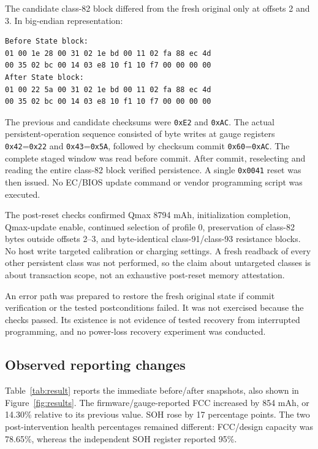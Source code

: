 \documentclass[11pt,a4paper]{article}
\newcommand{\hex}[1]{\texttt{0x#1}}
\newcommand{\code}[1]{\texttt{\detokenize{#1}}}
\begin{document}
The candidate class-82 block differed from the fresh original only at offsets 2 and 3. In big-endian representation:
\begin{lstlisting}
Before State block:
01 00 1e 28 00 31 02 1e bd 00 11 02 fa 88 ec 4d
00 35 02 bc 00 14 03 e8 10 f1 10 f7 00 00 00 00
After State block:
01 00 22 5a 00 31 02 1e bd 00 11 02 fa 88 ec 4d
00 35 02 bc 00 14 03 e8 10 f1 10 f7 00 00 00 00
\end{lstlisting}
The previous and candidate checksums were \hex{E2} and \hex{AC}. The actual persistent-operation sequence consisted of byte writes at gauge registers \hex{42}=\hex{22} and \hex{43}=\hex{5A}, followed by checksum commit \hex{60}=\hex{AC}. The complete staged window was read before commit. After commit, reselecting and reading the entire class-82 block verified persistence. A single \code{Control()} \hex{0041} reset was then issued. No EC/BIOS update command or vendor programming script was executed.

The post-reset checks confirmed Qmax 8794 mAh, initialization completion, Qmax-update enable, continued selection of profile 0, preservation of class-82 bytes outside offsets 2--3, and byte-identical class-91/class-93 resistance blocks. No host write targeted calibration or charging settings. A fresh readback of every other persistent class was not performed, so the claim about untargeted classes is about transaction scope, not an exhaustive post-reset memory attestation.

An error path was prepared to restore the fresh original state if commit verification or the tested postconditions failed. It was not exercised because the checks passed. Its existence is not evidence of tested recovery from interrupted programming, and no power-loss recovery experiment was conducted.

\subsection{Observed reporting changes}
Table~\ref{tab:result} reports the immediate before/after snapshots, also shown in Figure~\ref{fig:results}. The firmware/gauge-reported FCC increased by 854 mAh, or 14.30\% relative to its previous value. SOH rose by 17 percentage points. The two post-intervention health percentages remained different: FCC/design capacity was 78.65\%, whereas the independent SOH register reported 95\%.
\end{document}
